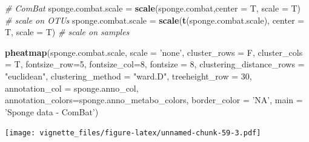 \documentclass[]{book}
\newenvironment{Shaded}{\begin{snugshade}}{\end{snugshade}}
\newcommand{\KeywordTok}[1]{\textcolor[rgb]{0.13,0.29,0.53}{\textbf{#1}}}
\newcommand{\DataTypeTok}[1]{\textcolor[rgb]{0.13,0.29,0.53}{#1}}
\newcommand{\DecValTok}[1]{\textcolor[rgb]{0.00,0.00,0.81}{#1}}
\newcommand{\StringTok}[1]{\textcolor[rgb]{0.31,0.60,0.02}{#1}}
\newcommand{\CommentTok}[1]{\textcolor[rgb]{0.56,0.35,0.01}{\textit{#1}}}
\newcommand{\NormalTok}[1]{#1}
\begin{document}
\begin{Shaded}
\begin{Highlighting}[]
\CommentTok{# ComBat }
\NormalTok{sponge.combat.scale =}\StringTok{ }\KeywordTok{scale}\NormalTok{(sponge.combat,}\DataTypeTok{center =}\NormalTok{ T, }\DataTypeTok{scale =}\NormalTok{ T) }\CommentTok{# scale on OTUs}
\NormalTok{sponge.combat.scale =}\StringTok{ }\KeywordTok{scale}\NormalTok{(}\KeywordTok{t}\NormalTok{(sponge.combat.scale), }\DataTypeTok{center =}\NormalTok{ T, }\DataTypeTok{scale =}\NormalTok{ T) }\CommentTok{# scale on samples}

\KeywordTok{pheatmap}\NormalTok{(sponge.combat.scale, }
         \DataTypeTok{scale =} \StringTok{'none'}\NormalTok{, }
         \DataTypeTok{cluster_rows =}\NormalTok{ F, }
         \DataTypeTok{cluster_cols =}\NormalTok{ T, }
         \DataTypeTok{fontsize_row=}\DecValTok{5}\NormalTok{, }\DataTypeTok{fontsize_col=}\DecValTok{8}\NormalTok{,}
         \DataTypeTok{fontsize =} \DecValTok{8}\NormalTok{,}
         \DataTypeTok{clustering_distance_rows =} \StringTok{"euclidean"}\NormalTok{,}
         \DataTypeTok{clustering_method =} \StringTok{"ward.D"}\NormalTok{,}
         \DataTypeTok{treeheight_row =} \DecValTok{30}\NormalTok{,}
         \DataTypeTok{annotation_col =}\NormalTok{ sponge.anno_col,}
         \DataTypeTok{annotation_colors=}\NormalTok{sponge.anno_metabo_colors,}
         \DataTypeTok{border_color =} \StringTok{'NA'}\NormalTok{,}
         \DataTypeTok{main =} \StringTok{'Sponge data - ComBat'}\NormalTok{)}
\end{Highlighting}
\end{Shaded}

\texttt{[image: vignette\_files/figure-latex/unnamed-chunk-59-3.pdf]}
\end{document}
